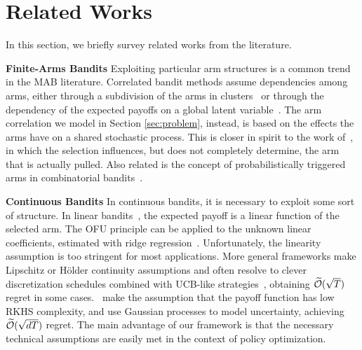 \documentclass{article}
\begin{document}
\section{Related Works}\label{sec:related}
In this section, we briefly survey related works from the literature.

\textbf{Finite-Arms Bandits} Exploiting particular arm structures is a common trend in the MAB literature. Correlated bandit methods assume dependencies among arms, either through a subdivision of the arms in clusters~\cite{pandey2007multi,wang2018regional} or through the dependency of the expected payoffs on a global latent variable~\cite{mersereau2009structured,atan2015global}. The arm correlation we model in Section \ref{sec:problem}, instead, is based on the effects the arms have on a shared stochastic process. This is closer in spirit to the work of~\citet{kallus2018instrument}, in which the selection influences, but does not completely determine, the arm that is actually pulled.
Also related is the concept of probabilistically triggered arms in combinatorial bandits~\citep{cesa2012combinatorial,saritacc2017combinatorial,chen2016combinatorial}.

\textbf{Continuous Bandits} In continuous bandits, it is necessary to exploit some sort of structure. In linear bandits~\cite{auer2002using}, the expected payoff is a linear function of the selected arm. The OFU principle can be applied to the unknown linear coefficients, estimated with ridge regression~\citep{abbasi2011improved}. Unfortunately, the linearity assumption is too stringent for most applications. More general frameworks make Lipschitz or H\"older continuity assumptions and often resolve to clever discretization schedules combined with UCB-like strategies~\citep{kleinberg2005nearly,auer2007improved,kleinberg2008multi,bubeck2009online}, obtaining $\widetilde{\mathcal{O}}(\sqrt{T})$ regret in some cases.~\citet{srinivas2010gaussian} make the assumption that the payoff function has low RKHS complexity, and use Gaussian processes to model uncertainty, achieving $\widetilde{\mathcal{O}}(\sqrt{dT})$ regret. The main advantage of our framework is that the necessary technical assumptions are easily met in the context of policy optimization.
\end{document}
